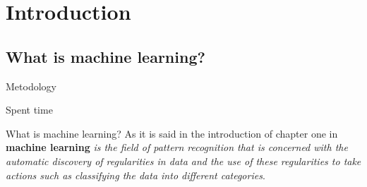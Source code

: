\renewcommand{\sectiontitle}{Introduction}
\section{\sectiontitle}

\renewcommand{\subsectiontitle}{What is machine learning?}
\subsection{\subsectiontitle}



\begin{frame}{Metodology}
  
\end{frame}

\begin{frame}{Spent time}
  
\end{frame}
\begin{frame}{\subsectiontitle}
    As it is said in the introduction of chapter one in  \cite{BishopPatternRecognition}
 \textbf{machine learning} \textit{is the field of pattern 
recognition that is concerned with the automatic
 discovery of regularities in data and the use of
these regularities to take actions such as 
classifying the data into different categories}.
\end{frame}

\renewcommand{\subsectiontitle}{Math formulation}
